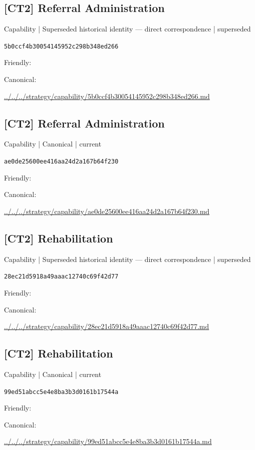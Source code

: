 \documentclass[10pt,a4paper]{article}
\begin{document}
\subsection*{[CT2] Referral Administration}
{\small Capability | Superseded historical identity — direct correspondence | superseded}\par
\texttt{5b0ccf4b30054145952c298b348ed266}\par
Friendly: \par
Canonical: \par
{\footnotesize\url{../../../strategy/capability/5b0ccf4b30054145952c298b348ed266.md}}\par
\subsection*{[CT2] Referral Administration}
{\small Capability | Canonical | current}\par
\texttt{ae0de25600ee416aa24d2a167b64f230}\par
Friendly: \par
Canonical: \par
{\footnotesize\url{../../../strategy/capability/ae0de25600ee416aa24d2a167b64f230.md}}\par
\subsection*{[CT2] Rehabilitation}
{\small Capability | Superseded historical identity — direct correspondence | superseded}\par
\texttt{28ec21d5918a49aaac12740c69f42d77}\par
Friendly: \par
Canonical: \par
{\footnotesize\url{../../../strategy/capability/28ec21d5918a49aaac12740c69f42d77.md}}\par
\subsection*{[CT2] Rehabilitation}
{\small Capability | Canonical | current}\par
\texttt{99ed51abcc5e4e8ba3b3d0161b17544a}\par
Friendly: \par
Canonical: \par
{\footnotesize\url{../../../strategy/capability/99ed51abcc5e4e8ba3b3d0161b17544a.md}}\par
\end{document}
